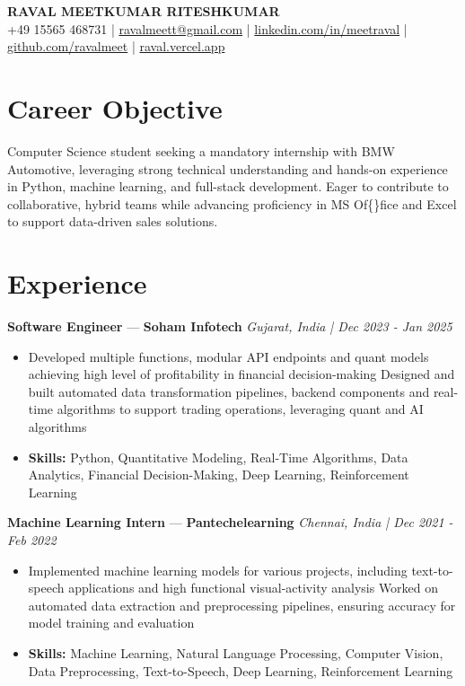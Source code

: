 \documentclass[a4paper,10pt]{article}
\begin{document}
\begin{center}
  {\Large\bfseries RAVAL MEETKUMAR RITESHKUMAR}\\[2pt]
  {\small +49 15565 468731 \;|\; \href{mailto:ravalmeett@gmail.com}{ravalmeett@gmail.com} \;|\; \href{https://www.linkedin.com/in/meetraval/}{linkedin.com/in/meetraval} \;|\; \href{https://github.com/ravalmeet}{github.com/ravalmeet} \;|\; \href{https://raval.vercel.app/}{raval.vercel.app}}
\end{center}
\vspace{-3pt}

\section*{Career Objective}
Computer Science student seeking a mandatory internship with BMW Automotive, leveraging strong technical understanding and hands-on experience in Python, machine learning, and full-stack development. Eager to contribute to collaborative, hybrid teams while advancing proficiency in MS Of\{\}fice and Excel to support data-driven sales solutions.\par

\section*{Experience}
\textbf{Software Engineer} — \textbf{Soham Infotech} \hfill \textit{Gujarat, India \;|\; Dec 2023 - Jan 2025}\par
\vspace{1pt}
\begin{itemize}
  \item Developed multiple functions, modular API endpoints and quant models achieving high level of profitability in financial decision-making Designed and built automated data transformation pipelines, backend components and real-time algorithms to support trading operations, leveraging quant and AI algorithms
  \item \textbf{Skills:} Python, Quantitative Modeling, Real-Time Algorithms, Data Analytics, Financial Decision-Making, Deep Learning, Reinforcement Learning
\end{itemize}
\vspace{3pt}
\textbf{Machine Learning Intern} — \textbf{Pantechelearning} \hfill \textit{Chennai, India \;|\; Dec 2021 - Feb 2022}\par
\vspace{1pt}
\begin{itemize}
  \item Implemented machine learning models for various projects, including text-to-speech applications and high functional visual-activity analysis Worked on automated data extraction and preprocessing pipelines, ensuring accuracy for model training and evaluation
  \item \textbf{Skills:} Machine Learning, Natural Language Processing, Computer Vision, Data Preprocessing, Text-to-Speech, Deep Learning, Reinforcement Learning
\end{itemize}
\end{document}
